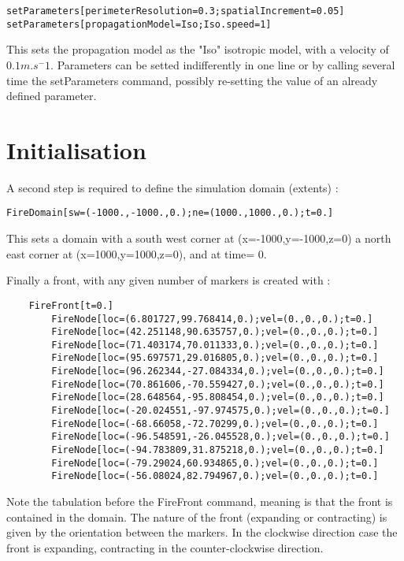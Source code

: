 \begin{verbatim}
setParameters[perimeterResolution=0.3;spatialIncrement=0.05]
setParameters[propagationModel=Iso;Iso.speed=1]
\end{verbatim}

This sets the propagation model as the "Iso" isotropic model, with a velocity of $0.1 m.s^-1$. Parameters can be setted indifferently in one line or by calling several time the setParameters command, possibly re-setting the value of an already defined parameter.


\section{Initialisation}
A second step is required to define the simulation domain (extents) :
\begin{verbatim}
FireDomain[sw=(-1000.,-1000.,0.);ne=(1000.,1000.,0.);t=0.]
\end{verbatim}
This sets a domain with a south west corner at (x=-1000,y=-1000,z=0) a north east corner at (x=1000,y=1000,z=0), and at time= 0.

Finally a front, with any given number of markers is created with :
\begin{verbatim}
    FireFront[t=0.]
        FireNode[loc=(6.801727,99.768414,0.);vel=(0.,0.,0.);t=0.]
        FireNode[loc=(42.251148,90.635757,0.);vel=(0.,0.,0.);t=0.]
        FireNode[loc=(71.403174,70.011333,0.);vel=(0.,0.,0.);t=0.]
        FireNode[loc=(95.697571,29.016805,0.);vel=(0.,0.,0.);t=0.]
        FireNode[loc=(96.262344,-27.084334,0.);vel=(0.,0.,0.);t=0.]
        FireNode[loc=(70.861606,-70.559427,0.);vel=(0.,0.,0.);t=0.]
        FireNode[loc=(28.648564,-95.808454,0.);vel=(0.,0.,0.);t=0.]
        FireNode[loc=(-20.024551,-97.974575,0.);vel=(0.,0.,0.);t=0.]
        FireNode[loc=(-68.66058,-72.70299,0.);vel=(0.,0.,0.);t=0.]
        FireNode[loc=(-96.548591,-26.045528,0.);vel=(0.,0.,0.);t=0.]
        FireNode[loc=(-94.783809,31.875218,0.);vel=(0.,0.,0.);t=0.]
        FireNode[loc=(-79.29024,60.934865,0.);vel=(0.,0.,0.);t=0.]
        FireNode[loc=(-56.08024,82.794967,0.);vel=(0.,0.,0.);t=0.]
\end{verbatim}

Note the tabulation before the FireFront command, meaning is that the front is contained in the domain. The nature of the front (expanding or contracting) is given by the orientation between the markers. In the clockwise direction case the front is expanding, contracting in the counter-clockwise direction.


